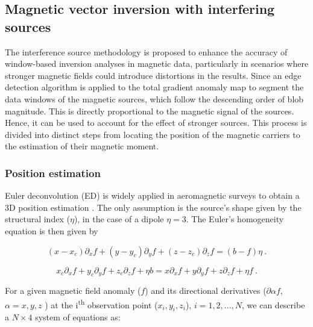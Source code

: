 \subsection{Magnetic vector inversion with interfering sources}\label{inversion-section}

The interference source methodology is proposed to enhance the accuracy of window-based inversion analyses in magnetic data, particularly in scenarios where stronger magnetic fields could introduce distortions in the results. Since an edge detection algorithm is applied to the total gradient anomaly map to segment the data windows of the magnetic sources, which follow the descending order of blob magnitude. This is directly proportional to the magnetic signal of the sources. Hence, it can be used to account for the effect of stronger sources. This process is divided into distinct steps from locating the position of the magnetic carriers to the estimation of their magnetic moment.


\subsubsection{Position estimation}
    Euler deconvolution (ED) is widely applied in aeromagnetic surveys \citep{Barbosa2011, Melo2013, Melo2018} to obtain a 3D position estimation \cite[after][]{Reid1990}. The only assumption is the source's shape given by the structural index ($\eta$), in the case of a dipole $\eta = 3$. The Euler's homogeneity equation is then given by
    
        \begin{equation}
        \label{eq_euler_homogeneity}
        (x - x_c)\partial_x f
        + (y - y_c)\partial_y f
        + (z - z_c)\partial_z f
        = (b - f)\eta
        \ .
        \end{equation}
    
    
    \begin{equation}
    x_c \partial_x f + y_c \partial_y f + z_c \partial_z f + \eta b
    =
    x \partial_x f + y \partial_y f + z \partial_z f + \eta f
    \ .
    \end{equation}
    
    For a given magnetic field anomaly ($f$) and its directional derivatives ($\partial \alpha f$, $\alpha = x, y, z$ ) at the i\textsuperscript{th} observation point ($x_i, y_i, z_i$), $i=1, 2,..., N$, we can describe a $N \times 4$ system of equations as:
    
